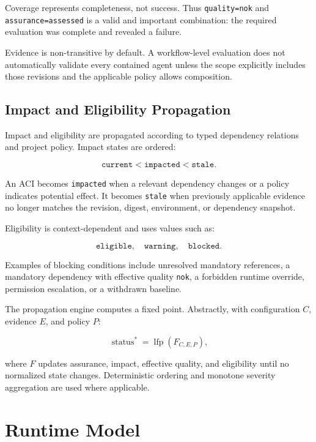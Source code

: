 \documentclass[10pt]{article}
\begin{document}
Coverage represents completeness, not success. Thus \texttt{quality=nok} and \texttt{assurance=assessed} is a valid and important combination: the required evaluation was complete and revealed a failure.

Evidence is non-transitive by default. A workflow-level evaluation does not automatically validate every contained agent unless the scope explicitly includes those revisions and the applicable policy allows composition.

\subsection{Impact and Eligibility Propagation}

Impact and eligibility are propagated according to typed dependency relations and project policy. Impact states are ordered:

\[
\texttt{current} < \texttt{impacted} < \texttt{stale}.
\]

An ACI becomes \texttt{impacted} when a relevant dependency changes or a policy indicates potential effect. It becomes \texttt{stale} when previously applicable evidence no longer matches the revision, digest, environment, or dependency snapshot.

Eligibility is context-dependent and uses values such as:

\[
\texttt{eligible},\quad \texttt{warning},\quad \texttt{blocked}.
\]

Examples of blocking conditions include unresolved mandatory references, a mandatory dependency with effective quality \texttt{nok}, a forbidden runtime override, permission escalation, or a withdrawn baseline.

The propagation engine computes a fixed point. Abstractly, with configuration $C$, evidence $E$, and policy $P$:

\begin{equation}
\operatorname{status}^{*}=\operatorname{lfp}\left(F_{C,E,P}\right),
\end{equation}

where $F$ updates assurance, impact, effective quality, and eligibility until no normalized state changes. Deterministic ordering and monotone severity aggregation are used where applicable.

\section{Runtime Model}
\label{sec:runtime}
\end{document}
